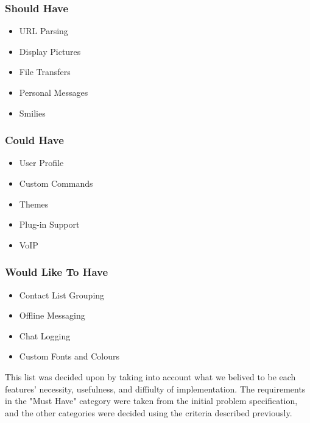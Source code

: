 \subsubsection{Should Have}

\begin{itemize}

\item{URL Parsing}
\item{Display Pictures}
\item{File Transfers}
\item{Personal Messages}
\item{Smilies}

\end{itemize}

\subsubsection{Could Have}

\begin{itemize}

\item{User Profile}
\item{Custom Commands}
\item{Themes}
\item{Plug-in Support}
\item{VoIP}

\end{itemize}

\subsubsection{Would Like To Have}

\begin{itemize}

\item{Contact List Grouping}
\item{Offline Messaging}
\item{Chat Logging}
\item{Custom Fonts and Colours}

\end{itemize}

This list was decided upon by taking into account what we belived to be each features' necessity, usefulness, and diffiulty of implementation. The requirements in the "Must Have" category were taken from the initial problem specification, and the other categories were decided using the criteria described previously.

